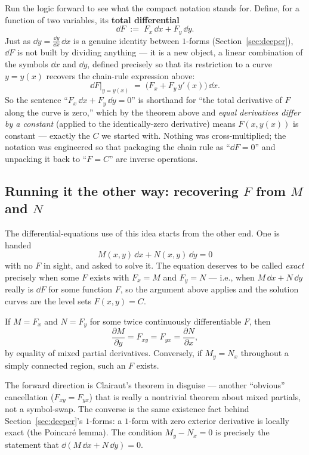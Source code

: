 \documentclass{essay}
\newcommand{\ddx}[1]{\frac{\dd #1}{\dd x}}
\newcommand{\pd}[2]{\frac{\partial #1}{\partial #2}}
\begin{document}
Run the logic forward to see what the compact notation stands for.
Define, for a function of two variables, its \textbf{total
differential}
\[ \dd F \;:=\; F_{x}\,\dd x + F_{y}\,\dd y . \]
Just as \(\dd y = \ddx{y}\,\dd x\) is a genuine identity between
\(1\)-forms (Section~\ref{sec:deeper}), \(\dd F\) is not built by dividing
anything --- it is a new object, a linear combination of the symbols
\(\dd x\) and \(\dd y\), defined precisely so that its restriction to a
curve \(y=y(x)\) recovers the chain-rule expression above:
\[ \dd F \big|_{y=y(x)} \;=\; \bigl(F_{x} + F_{y}\,y'(x)\bigr)\,\dd x . \]
So the sentence ``\(F_{x}\,\dd x+F_{y}\,\dd y=0\)'' is shorthand for ``the
total derivative of \(F\) along the curve is zero,'' which by the
theorem above and \emph{equal derivatives differ by a constant}
(applied to the identically-zero derivative) means \(F(x,y(x))\) is
constant --- exactly the \(C\) we started with. Nothing was
cross-multiplied; the notation was engineered so that packaging the
chain rule as ``\(\dd F=0\)'' and unpacking it back to ``\(F=C\)'' are
inverse operations.

\subsection{Running it the other way: recovering \(F\) from \(M\) and \(N\)}

The differential-equations use of this idea starts from the other end.
One is handed
\[ M(x,y)\,\dd x + N(x,y)\,\dd y = 0 \]
with no \(F\) in sight, and asked to solve it. The equation deserves to
be called \emph{exact} precisely when some \(F\) exists with \(F_{x}=M\) and
\(F_{y}=N\) --- i.e., when \(M\,\dd x+N\,\dd y\) really is \(\dd F\) for some
function \(F\), so the argument above applies and the solution curves
are the level sets \(F(x,y)=C\).

\begin{proposition}
  If \(M=F_{x}\) and \(N=F_{y}\) for some twice continuously differentiable
  \(F\), then
  \[ \pd{M}{y} = F_{xy} = F_{yx} = \pd{N}{x}, \]
  by equality of mixed partial derivatives. Conversely, if \(M_{y}=N_{x}\)
  throughout a simply connected region, such an \(F\) exists.
\end{proposition}
The forward direction is Clairaut's theorem in disguise --- another
``obvious'' cancellation (\(F_{xy}=F_{yx}\)) that is really a
nontrivial theorem about mixed partials, not a symbol-swap. The
converse is the same existence fact behind Section~\ref{sec:deeper}'s
\(1\)-forms: a \(1\)-form with zero exterior derivative is locally exact
(the Poincar\'e lemma). The condition \(M_{y}-N_{x}=0\) is precisely the
statement that \(\dd(M\,\dd x+N\,\dd y)=0\).
\end{document}
